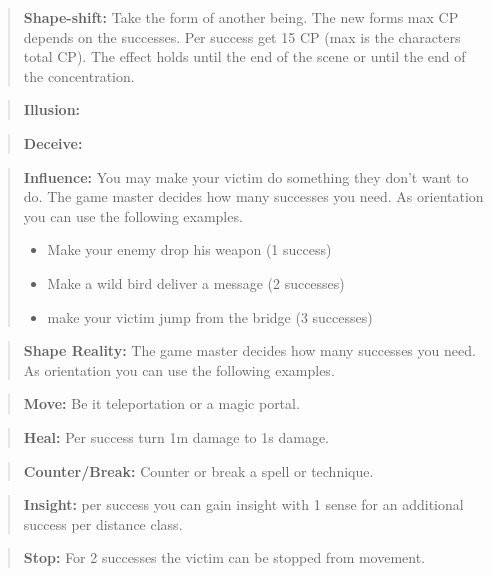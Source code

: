 \documentclass[11pt]{article}
\begin{document}
{\begin{multicols}{2}[]
\begin{quote}
\textbf{Shape-shift:} Take the form of another being. The new forms max CP depends on the successes. Per success get 15 CP (max is the characters total CP). The effect holds until the end of the scene or until the end of the concentration.
\end{quote}

\begin{quote}
\textbf{Illusion:}
\end{quote}

\begin{quote}
\textbf{Deceive:} 
\end{quote}

\begin{quote}
\textbf{Influence:} You may make your victim do something they don't want to do. The game master decides how many successes you need. As orientation you can use the following examples.
\begin{itemize}
\item Make your enemy drop his weapon (1 success)
\item Make a wild bird deliver a message (2 successes)
\item make your victim jump from the bridge (3 successes)
\end{itemize}
\end{quote}

\begin{quote}
\textbf{Shape Reality:}  The game master decides how many successes you need. As orientation you can use the following examples.
\end{quote}

\begin{quote}
\textbf{Move:} Be it teleportation or a magic portal. 
\end{quote}

\begin{quote}
\textbf{Heal:} Per success turn 1m damage to 1s damage.
\end{quote}

\begin{quote}
\textbf{Counter/Break:} Counter or break a spell or technique.
\end{quote}

\begin{quote}
\textbf{Insight:} per success you can gain insight with 1 sense for an additional success per distance class.
\end{quote}

\begin{quote}
\textbf{Stop:} For 2 successes the victim can be stopped from movement.
\end{quote}


\end{multicols}}
\end{document}
